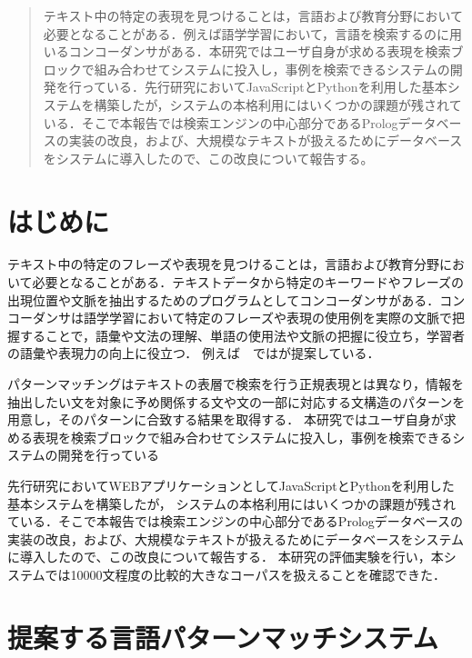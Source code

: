 \documentclass{FITpaper}
\begin{document}
\maketitle
\begin{abstract}
  テキスト中の特定の表現を見つけることは，言語および教育分野において必要となることがある．例えば語学学習において，言語を検索するのに用いるコンコーダンサがある．本研究ではユーザ自身が求める表現を検索ブロックで組み合わせてシステムに投入し，事例を検索できるシステムの開発を行っている．先行研究においてJavaScriptとPythonを利用した基本システムを構築したが，システムの本格利用にはいくつかの課題が残されている．そこで本報告では検索エンジンの中心部分であるPrologデータベースの実装の改良，および、大規模なテキストが扱えるためにデータベースをシステムに導入したので、この改良について報告する。 
\end{abstract}
\section{はじめに}
テキスト中の特定のフレーズや表現を見つけることは，言語および教育分野において必要となることがある．テキストデータから特定のキーワードやフレーズの出現位置や文脈を抽出するためのプログラムとしてコンコーダンサがある．コンコーダンサは語学学習において特定のフレーズや表現の使用例を実際の文脈で把握することで，語彙や文法の理解、単語の使用法や文脈の把握に役立ち，学習者の語彙や表現力の向上に役立つ．
例えば　ではが提案している．

パターンマッチングはテキストの表層で検索を行う正規表現とは異なり，情報を抽出したい文を対象に予め関係する文や文の一部に対応する文構造のパターンを用意し，そのパターンに合致する結果を取得する．
本研究ではユーザ自身が求める表現を検索ブロックで組み合わせてシステムに投入し，事例を検索できるシステムの開発を行っている



先行研究においてWEBアプリケーションとしてJavaScriptとPythonを利用した基本システムを構築したが，
システムの本格利用にはいくつかの課題が残されている．そこで本報告では検索エンジンの中心部分であるPrologデータベースの実装の改良，および、大規模なテキストが扱えるためにデータベースをシステムに導入したので、この改良について報告する．
本研究の評価実験を行い，本システムでは10000文程度の比較的大きなコーパスを扱えることを確認できた．
\section{提案する言語パターンマッチシステム}
\end{document}
